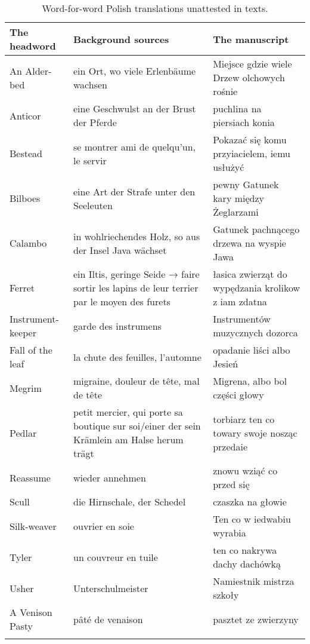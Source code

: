 \documentclass[output=paper,colorlinks,citecolor=brown,arabicfont,chinesefont]{langscibook}
\begin{document}
\begin{table}[t]
\small
\caption {Word-for-word Polish translations unattested in texts.}
\label{tab:Podhajecka:table2}
\label{tab:Podhajecka:2}
\begin{tabularx}{\linewidth}{ lQQ }
\lsptoprule
The headword & Background sources  & The manuscript\\
\midrule
An Alder-bed & ein Ort, wo viele Erlenbäume wachsen & Miejsce gdzie wiele Drzew olchowych rośnie \\
Anticor & eine Geschwulst an der Brust der Pferde & puchlina na piersiach konia\\
Bestead & se montrer ami de quelqu'un, le servir & Pokazać się komu przyiacielem, iemu usłużyć \\
Bilboes & eine Art der Strafe unter den Seeleuten & pewny Gatunek kary między Żeglarzami \\
Calambo & in wohlriechendes Holz, so aus der Insel Java wächset & Gatunek pachnącego drzewa na wyspie Jawa \\
Ferret & ein Iltis, geringe Seide → faire sortir les lapins de leur terrier par le moyen des furets
 & łasica zwierząt do wypędzania krolikow z iam zdatna \\
Instrument-keeper & garde des instrumens & Instrumentów muzycznych dozorca \\
Fall of the leaf & la chute des feuilles, l'automne & opadanie liści albo Jesień \\
Megrim & migraine, douleur de tête, mal de tête & Migrena, albo bol części głowy \\
Pedlar & petit mercier, qui porte sa boutique sur soi\slash einer der sein Krämlein am Halse herum trägt  & torbiarz ten co towary swoje nosząc przedaie \\
Reassume & wieder annehmen & znowu wziąć co przed się \\
Scull & die Hirnschale, der Schedel & czaszka na głowie \\
Silk-weaver & ouvrier en soie & Ten co w iedwabiu wyrabia \\
Tyler & un couvreur en tuile & ten co nakrywa dachy dachówką \\
Usher & Unterschulmeister & Namiestnik mistrza szkoły \\
A Venison Pasty & pâté de venaison & pasztet ze zwierzyny \\
\lspbottomrule
\end{tabularx}
\end{table}
\end{document}
